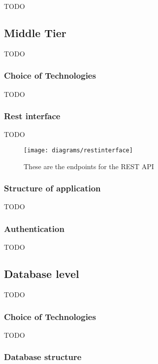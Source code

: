 {TODO}

\subsection{Middle Tier}

{TODO}

\subsubsection*{Choice of Technologies}
\label{sec:node_choice_of_tech}

{TODO}

\subsubsection*{Rest interface}

{TODO}

\begin{figure}[H]
    \centering
    \texttt{[image: diagrams/restinterface]}
    \caption{These are the endpoints for the REST API}
    \label{fig:rest_pai_diagram_image}
\end{figure} 
\noindent

\subsubsection*{Structure of application}

{TODO}

\subsubsection*{Authentication}

{TODO}

\subsection{Database level}

{TODO}

\subsubsection*{Choice of Technologies}
\label{sec:database_choice_of_tech}

{TODO}

\subsubsection*{Database structure}

